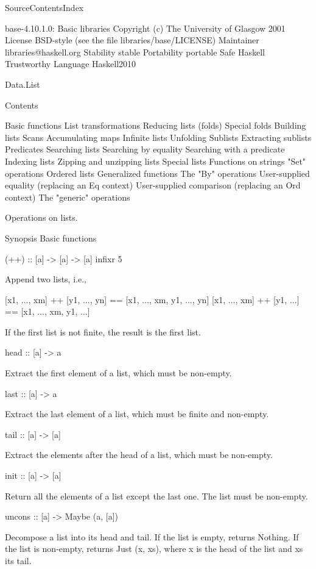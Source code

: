    SourceContentsIndex

base-4.10.1.0: Basic libraries
Copyright	(c) The University of Glasgow 2001
License	BSD-style (see the file libraries/base/LICENSE)
Maintainer	libraries@haskell.org
Stability	stable
Portability	portable
Safe Haskell	Trustworthy
Language	Haskell2010

Data.List

Contents

    Basic functions
    List transformations
    Reducing lists (folds)
        Special folds
    Building lists
        Scans
        Accumulating maps
        Infinite lists
        Unfolding
    Sublists
        Extracting sublists
        Predicates
    Searching lists
        Searching by equality
        Searching with a predicate
    Indexing lists
    Zipping and unzipping lists
    Special lists
        Functions on strings
        "Set" operations
        Ordered lists
    Generalized functions
        The "By" operations
            User-supplied equality (replacing an Eq context)
            User-supplied comparison (replacing an Ord context)
        The "generic" operations

Operations on lists.

Synopsis
Basic functions

(++) :: [a] -> [a] -> [a] infixr 5

Append two lists, i.e.,

[x1, ..., xm] ++ [y1, ..., yn] == [x1, ..., xm, y1, ..., yn]
[x1, ..., xm] ++ [y1, ...] == [x1, ..., xm, y1, ...]

If the first list is not finite, the result is the first list.

head :: [a] -> a

Extract the first element of a list, which must be non-empty.

last :: [a] -> a

Extract the last element of a list, which must be finite and non-empty.

tail :: [a] -> [a]

Extract the elements after the head of a list, which must be non-empty.

init :: [a] -> [a]

Return all the elements of a list except the last one. The list must be non-empty.

uncons :: [a] -> Maybe (a, [a])

Decompose a list into its head and tail. If the list is empty, returns Nothing. If the list is non-empty, returns Just (x, xs), where x is the head of the list and xs its tail.

